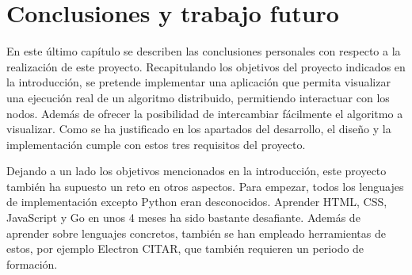 \chapter{Conclusiones y trabajo futuro}

En este último capítulo se describen las conclusiones personales con respecto a la realización de este proyecto. Recapitulando los objetivos del proyecto indicados en la introducción, se pretende implementar una aplicación que permita visualizar una ejecución real de un algoritmo distribuido, permitiendo interactuar con los nodos. Además de ofrecer la posibilidad de intercambiar fácilmente el algoritmo a visualizar. Como se ha justificado en los apartados del desarrollo, el diseño y la implementación cumple con estos tres requisitos del proyecto.

Dejando a un lado los objetivos mencionados en la introducción, este proyecto también ha supuesto un reto en otros aspectos. Para empezar, todos los lenguajes de implementación excepto Python eran desconocidos. Aprender HTML, CSS, JavaScript y Go en unos 4 meses ha sido bastante desafiante. Además de aprender sobre lenguajes concretos, también se han empleado herramientas de estos, por ejemplo Electron CITAR, que también requieren un periodo de formación.
